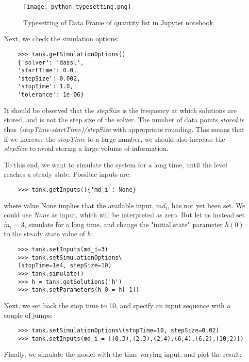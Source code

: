 \begin{figure}
	\texttt{[image: python\_typesetting.png]}
	\caption{Typesetting of Data Frame of quantity list in Jupyter notebook.}
	\label{fig:pythontypesetting}
\end{figure}

Next, we check the simulation options:

\begin{lstlisting}
	>>> tank.getSimulationOptions()
	{'solver': 'dassl',
	'startTime': 0.0,
	'stepSize': 0.002,
	'stopTime': 1.0,
	'tolerance': 1e-06}
\end{lstlisting}

It should be observed that the \textit{stepSize} is the frequency at which solutions are stored, and is not the step
size of the solver. The number of data points \textit{stored} is thus \textit{(stopTime-startTime)/stepSize} with appropriate
rounding. This means that if we increase the \textit{stopTime} to a large number, we should also increase the \textit{stepSize} to
avoid storing a large volume of information.


To this end, we want to simulate the system for a long time, until the level reaches a steady state. Possible inputs are:

\begin{lstlisting}
	>>> tank.getInputs(){'md_i': None}
\end{lstlisting}

where value None implies that the available input, $md_i$, has not yet been set. We could use \textit{None} as input, which will be interpreted as zero. 
But let us instead set $\dot{m}_i = 3$, simulate for a long time, and change the "initial state"
parameter $h (0)$ to the steady state value of $h$:

\begin{lstlisting}
	>>> tank.setInputs(md_i=3)
	>>> tank.setSimulationOptions\
	(stopTime=1e4, stepSize=10)
	>>> tank.simulate()
	>>> h = tank.getSolutions('h')
	>>> tank.setParameters(h_0 = h[-1])
\end{lstlisting}

Next, we set back the stop time to 10, and specify an input sequence with a couple of jumps:

\begin{lstlisting}
	>>> tank.setSimulationOptions\(stopTime=10, stepSize=0.02)
	>>> tank.setInputs(md_i = [(0,3),(2,3),(2,4),(6,4),(6,2),(10,2)])
\end{lstlisting}

Finally, we simulate the model with the time varying input, and plot the result:

